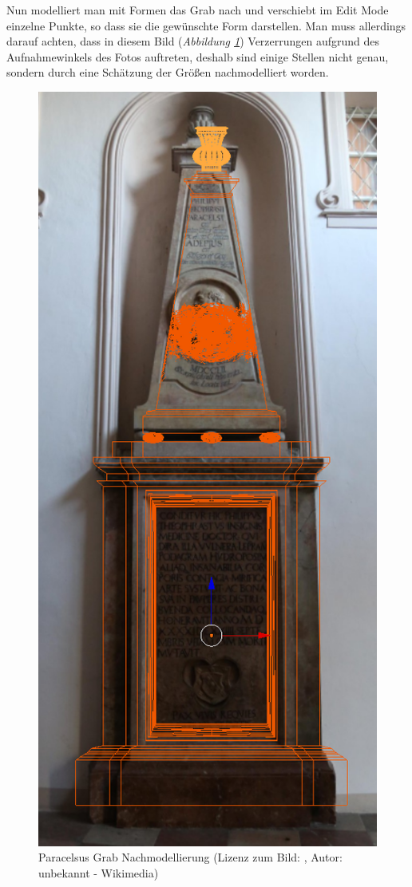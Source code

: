 Nun modelliert man mit Formen das Grab nach und verschiebt im Edit Mode einzelne Punkte, so dass sie die gewünschte Form darstellen.
Man muss allerdings darauf achten, dass in diesem Bild (\textit{Abbildung \ref{Paracelsus_Grab:image2}}) Verzerrungen aufgrund des
Aufnahmewinkels des Fotos auftreten, deshalb sind einige Stellen nicht genau, sondern
durch eine Schätzung der Größen nachmodelliert worden.

\begin{figure}[H]
    \centering
    \includegraphics[width=.8\textwidth]{images/Paracelsus-Grab_Nachmodellierung.png}
    \caption{Paracelsus Grab Nachmodellierung (Lizenz zum Bild: \citep{paracelsusgrab:bild}, Autor: unbekannt - Wikimedia)}
    \label{Paracelsus_Grab:image2}
\end{figure}

